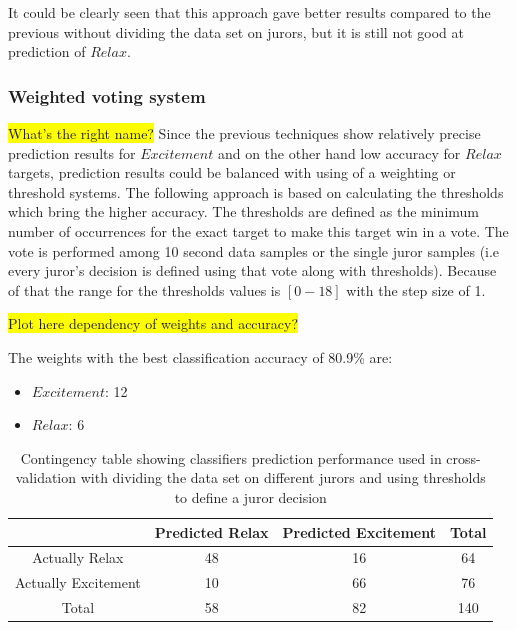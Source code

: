 \documentclass[12pt]{article}
\begin{document}
It could be clearly seen that this approach gave better results compared to the previous without dividing the data set on jurors, but it is still not good at prediction of $Relax$.

\subsubsection{Weighted voting system}
\colorbox{yellow}{What's the right name?}
Since the previous techniques show relatively precise prediction results for $Excitement$ and on the other hand low accuracy for $Relax$ targets, prediction results could be balanced with using of a weighting or threshold systems. The following approach is based on calculating the thresholds which bring the higher accuracy. The thresholds are defined as the minimum number of occurrences for the exact target to make this target win in a vote. The vote is performed among 10 second data samples or the single juror samples (i.e every juror's decision is defined using that vote along with thresholds). Because of that the range for the thresholds values is $[0-18]$ with the step size of 1. 

\colorbox{yellow}{Plot here dependency of weights and accuracy?}

The weights with the best classification accuracy of 80.9\% are:
\begin{itemize}
\item  $Excitement$: 12
\item  $Relax$: 6
\end{itemize}


\begin{table}[H]
\caption{Contingency table showing classifiers prediction performance used in cross-validation with dividing the data set on different jurors and using thresholds to define a juror decision} \label{tab:title} 
\begin{center}
  \begin{tabular}{ | c | c | c | c | }
    \hline
     & Predicted Relax & Predicted Excitement & Total \\ \hline
    Actually Relax & 48 & 16 & 64 \\ \hline
    Actually Excitement & 10 & 66 & 76 \\ \hline
    Total & 58 & 82 & 140 \\ 
    \hline
  \end{tabular}
\end{center}
\end{table}
\end{document}
